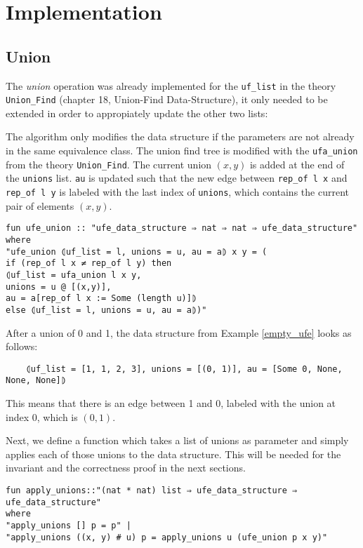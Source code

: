 \section{Implementation}

\subsection{Union}

The \emph{union} operation was already implemented for the \lstinline{uf_list} in the theory \lstinline{Union_Find} \cite{Sep} (chapter 18, Union-Find Data-Structure), it only needed to be extended in order to appropiately update the other two lists:

The algorithm only modifies the data structure if the parameters are not already in the same equivalence class.
The union find tree is modified with the \lstinline{ufa_union} from the theory \lstinline{Union_Find}\cite{Sep}.
The current union $(x, y)$ is added at the end of the \lstinline{unions} list.
\lstinline{au} is updated such that the new edge between \lstinline{rep_of l x} and \lstinline{rep_of l y} is labeled with the last index of \lstinline{unions}, which contains the current pair of elements $(x, y)$.

\begin{lstlisting}
fun ufe_union :: "ufe_data_structure ⇒ nat ⇒ nat ⇒ ufe_data_structure"
where
"ufe_union ⦇uf_list = l, unions = u, au = a⦈ x y = (
if (rep_of l x ≠ rep_of l y) then
⦇uf_list = ufa_union l x y,
unions = u @ [(x,y)],
au = a[rep_of l x := Some (length u)]⦈
else ⦇uf_list = l, unions = u, au = a⦈)"
\end{lstlisting}

\begin{exmp}
After a union of 0 and 1, the data structure from Example \ref{empty_ufe} looks as follows:
\begin{lstlisting}
	⦇uf_list = [1, 1, 2, 3], unions = [(0, 1)], au = [Some 0, None, None, None]⦈
\end{lstlisting}
This means that there is an edge between 1 and 0, labeled with the union at index 0, which is $(0,1)$.
\end{exmp}

Next, we define a function which takes a list of unions as parameter and simply applies each of those unions to the data structure. This will be needed for the invariant and the correctness proof in the next sections.

\begin{lstlisting}
fun apply_unions::"(nat * nat) list ⇒ ufe_data_structure ⇒ ufe_data_structure"
where
"apply_unions [] p = p" |
"apply_unions ((x, y) # u) p = apply_unions u (ufe_union p x y)"
\end{lstlisting}

